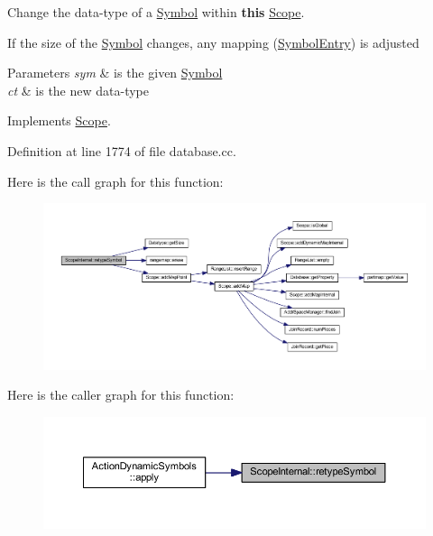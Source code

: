 Change the data-\/type of a \mbox{\hyperlink{class_symbol}{Symbol}} within {\bfseries{this}} \mbox{\hyperlink{class_scope}{Scope}}. 

If the size of the \mbox{\hyperlink{class_symbol}{Symbol}} changes, any mapping (\mbox{\hyperlink{class_symbol_entry}{Symbol\+Entry}}) is adjusted 
\begin{DoxyParams}{Parameters}
{\em sym} & is the given \mbox{\hyperlink{class_symbol}{Symbol}} \\
\hline
{\em ct} & is the new data-\/type \\
\hline
\end{DoxyParams}


Implements \mbox{\hyperlink{class_scope_afeef6a133b07fa176c08b67c44064e69}{Scope}}.



Definition at line 1774 of file database.\+cc.

Here is the call graph for this function\+:
\nopagebreak
\begin{figure}[H]
\begin{center}
\leavevmode
\includegraphics[width=350pt]{class_scope_internal_a9711a8084e1ac5c4417a4452c96a36b7_cgraph}
\end{center}
\end{figure}
Here is the caller graph for this function\+:
\nopagebreak
\begin{figure}[H]
\begin{center}
\leavevmode
\includegraphics[width=350pt]{class_scope_internal_a9711a8084e1ac5c4417a4452c96a36b7_icgraph}
\end{center}
\end{figure}
\mbox{\label{class_scope_internal_adf1804d94e0238692125668e0813ac94}} 
